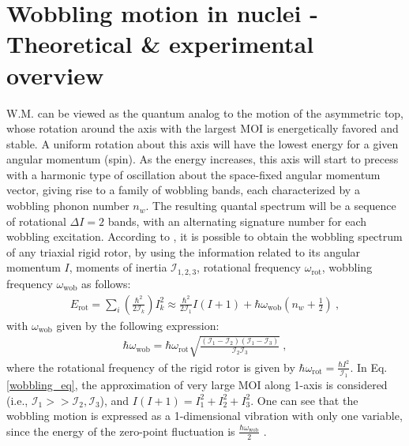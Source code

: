 \documentclass[11pt]{article}
\begin{document}

\section{Wobbling motion in nuclei - Theoretical \& experimental overview}

W.M. can be viewed as the quantum analog to the motion of the asymmetric top, whose rotation around the axis with the largest MOI is energetically favored and stable. A uniform rotation about this axis will have the lowest energy for a given angular momentum (spin). As the energy increases, this axis will start to precess with a harmonic type of oscillation about the space-fixed angular momentum vector, giving rise to a family of wobbling bands, each characterized by a wobbling phonon number $n_w$. The resulting quantal spectrum will be a sequence of rotational $\Delta I=2$ bands, with an alternating signature number for each wobbling excitation. According to \cite{bohr1998nuclear}, it is possible to obtain the wobbling spectrum of any triaxial rigid rotor, by using the information related to its angular momentum $I$, moments of inertia $\mathcal{I}_{1,2,3}$, rotational frequency $\omega_\text{rot}$, wobbling frequency $\omega_\text{wob}$ as follows:
\begin{align}
    E_\text{rot}=\sum_i\left(\frac{\hbar^2}{2\mathcal{I}_k}\right)I^2_k\approx\frac{\hbar^2}{2\mathcal{I}_1}I(I+1)+\hbar\omega_\text{wob}\left(n_w+\frac{1}{2}\right)\ , \label{wobbling_eq}
\end{align}
with $\omega_\text{wob}$ given by the following expression:
\begin{align}
    \hbar\omega_\text{wob}=\hbar\omega_\text{rot}\sqrt{\frac{(\mathcal{I}_1-\mathcal{I}_2)(\mathcal{I}_1-\mathcal{I}_3)}{\mathcal{I}_2\mathcal{I}_3}}\ ,
\end{align}
where the rotational frequency of the rigid rotor is given by $\hbar\omega_\text{rot}=\frac{\hbar I^2}{\mathcal{I}_1}$. In Eq. \ref{wobbling_eq}, the approximation of very large MOI along 1-axis is considered (i.e., $\mathcal{I}_1>>\mathcal{I}_2,\mathcal{I}_3$), and $I(I+1)=I_1^2+I_2^2+I_3^2$. One can see that the wobbling motion is expressed as a 1-dimensional vibration with only one variable, since the energy of the zero-point fluctuation is $\frac{\hbar\omega_\text{wob}}{2}$ \cite{hagemann2003quantized}.
\end{document}
